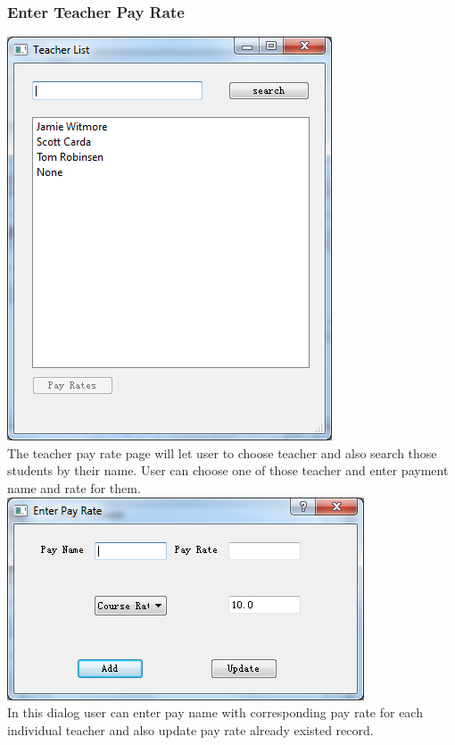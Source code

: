 \subsubsection{Enter Teacher Pay Rate}
\includegraphics[scale=0.5]{pics/pay_rate_main.png}\\
The teacher pay rate page will let user to choose teacher and also search those students by their name. User can choose one of those teacher and enter payment name and rate for them.\\
\includegraphics[scale=0.5]{pics/pay_rate_dialog.png}\\
In this dialog user can enter pay name with corresponding pay rate for each individual teacher and also update pay rate already existed record. 

